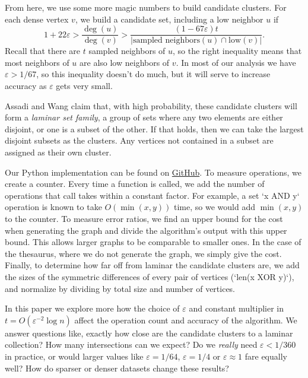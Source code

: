 \documentclass[
]{article}
\begin{document}
From here, we use some more magic numbers to build candidate clusters.
For each dense vertex {\(v\)}, we build a candidate set, including a low
neighbor {\(u\)} if
  {\[1 + 22\varepsilon > \frac{\deg(u)}{\deg(v)} > \frac{(1 - 67\varepsilon)t}{|\text{sampled\ neighbors}(u) \cap \text{low}(v)|}.\]}Recall
that there are {\(t\)} sampled neighbors of {\(u\)}, so the right
inequality means that most neighbors of {\(u\)} are also low neighbors
of {\(v\)}. In most of our analysis we have {\(\varepsilon > 1/67\)}, so
this inequality doesn't do much, but it will serve to
increase accuracy as {\(\varepsilon\)} gets very small.

Assadi and Wang claim that, with high probability, these candidate clusters will form a
\emph{laminar set family}, a group of sets where any two elements are either disjoint,
or one is a subset of the other.
If that holds, then we can take the largest disjoint subsets as the clusters.
Any vertices not contained in a subset are assigned as their own cluster.

Our Python implementation can be found on \href{https://github.com/cooljoseph1/Clustering-Algorithm-Implementation}{GitHub}. To measure operations, we create a counter. Every time a function is called, we add the number of operations that call takes within a constant factor. For example, a set `x AND y` operation is known to take $O(\min(x, y))$ time, so we would add $\min(x, y)$ to the counter. To measure error ratios, we find an upper bound for the cost when generating the graph and divide the algorithm's output with this upper bound. This allows larger graphs to be comparable to smaller ones. In the case of the thesaurus, where we do not generate the graph, we simply give the cost. Finally, to determine how far off from laminar the candidate clusters are, we add the sizes of the symmetric differences of every pair of vertices (`len(x XOR y)`), and normalize by dividing by total size and number of vertices.

In this paper we explore more how the choice of {\(\varepsilon\)} and
constant multiplier in {\(t = O(\varepsilon^{- 2}\log n)\)} affect the
operation count and accuracy of the algorithm. We answer questions like,
exactly how close are the candidate clusters to a laminar collection?
How many intersections can we expect? Do we \emph{really} need
  {\(\varepsilon < 1/360\)} in practice, or would larger values like
  {\(\varepsilon = 1/64\)}, {\(\varepsilon = 1/4\)} or
  {\(\varepsilon \approx 1\)} fare equally well? How do sparser or denser
datasets change these results?
\end{document}

